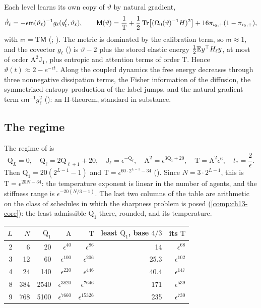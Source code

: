 Each level learns its own copy of \(\vartheta\) by natural gradient,
\[
\dot\vartheta_\ell=-\epsilon\mathsf m(\vartheta_\ell)^{-1}g_\ell(q^\ell_t,\vartheta_\ell),
\qquad
\mathsf M(\vartheta)=\frac1{\mathrm T}+\frac12\operatorname{Tr}\bigl[(\Omega_0(\vartheta)^{-1}H)^2\bigr]+16\pi_{i_0,+}(1-\pi_{i_0,+}),
\]
with \(\mathsf m=\mathrm T\mathsf M\) (;
). The metric is dominated by the calibration term, so
\(\mathsf m\approx1\), and the covector \(g_\ell\) () is \(\vartheta-2\)
plus the stored elastic energy \(\tfrac12\mathbb E y^\top H_\ell y\), at most of order \(\mathrm A^2\mathrm J_1\),
plus entropic and attention terms of order \(\mathrm T\). Hence
\(\vartheta(t)\approx2-e^{-\epsilon t}\). Along the coupled dynamics the free energy decreases through
three nonnegative dissipation terms, the Fisher information of the diffusion, the symmetrized entropy
production of the label jumps, and the natural-gradient term \(\epsilon\mathsf m^{-1}g_\ell^2\)
(): an H-theorem, standard in substance.

\subsection{The regime}
\label{comp:ch13-regime}

The regime of  is
\[
\mathrm Q_L=0,\quad \mathrm Q_\ell=2\mathrm Q_{\ell+1}+20,\quad \mathrm J_\ell=\epsilon^{-\mathrm Q_\ell},\quad
\mathrm A^2=\epsilon^{3\mathrm Q_1+20},\quad \mathrm T=\mathrm A^2\epsilon^6,\quad t_*=\frac2\epsilon .
\]
Then \(\mathrm Q_1=20(2^{L-1}-1)\) and \(\mathrm T=\epsilon^{60\cdot2^{L-1}-34}\) ().
Since \(N=3\cdot2^{L-1}\), this is \(\mathrm T=\epsilon^{20N-34}\): the temperature exponent is linear in the
number of agents, and the stiffness range is \(\epsilon^{-20(N/3-1)}\). The last two columns of the table
are arithmetic on the class of schedules in which the sharpness problem is posed
(\cref{comp:ch13-core}): the least admissible \(\mathrm Q_1\) there, rounded, and its temperature.

\begin{center}
\small
\begin{tabular}{@{}rrrrrrr@{}}
\toprule
\(L\) & \(N\) & \(\mathrm Q_1\) & \(\mathrm A\) & \(\mathrm T\) & least \(\mathrm Q_1\), base \(4/3\) & its \(\mathrm T\)\\
\midrule
2 & 6 & 20 & \(\epsilon^{40}\) & \(\epsilon^{86}\) & 14 & \(\epsilon^{68}\)\\
3 & 12 & 60 & \(\epsilon^{100}\) & \(\epsilon^{206}\) & 25.3 & \(\epsilon^{102}\)\\
4 & 24 & 140 & \(\epsilon^{220}\) & \(\epsilon^{446}\) & 40.4 & \(\epsilon^{147}\)\\
8 & 384 & 2540 & \(\epsilon^{3820}\) & \(\epsilon^{7646}\) & 171 & \(\epsilon^{539}\)\\
9 & 768 & 5100 & \(\epsilon^{7660}\) & \(\epsilon^{15326}\) & 235 & \(\epsilon^{730}\)\\
\bottomrule
\end{tabular}
\end{center}


